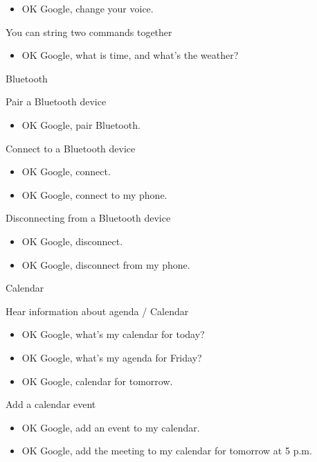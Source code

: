 \documentclass[
  a4paper,
]{article}
\providecommand{\tightlist}{%
  \setlength{\itemsep}{0pt}\setlength{\parskip}{0pt}}\usepackage{longtable,booktabs,array}
\begin{document}
\begin{itemize}
\tightlist
\item
  OK Google, change your voice.
\end{itemize}

You can string two commands together

\begin{itemize}
\tightlist
\item
  OK Google, what is time, and what's the weather?
\end{itemize}

Bluetooth

Pair a Bluetooth device

\begin{itemize}
\tightlist
\item
  OK Google, pair Bluetooth.
\end{itemize}

Connect to a Bluetooth device

\begin{itemize}
\tightlist
\item
  OK Google, connect.
\item
  OK Google, connect to my phone.
\end{itemize}

Disconnecting from a Bluetooth device

\begin{itemize}
\tightlist
\item
  OK Google, disconnect.
\item
  OK Google, disconnect from my phone.
\end{itemize}

Calendar

Hear information about agenda / Calendar

\begin{itemize}
\tightlist
\item
  OK Google, what's my calendar for today?
\item
  OK Google, what's my agenda for Friday?
\item
  OK Google, calendar for tomorrow.
\end{itemize}

Add a calendar event

\begin{itemize}
\tightlist
\item
  OK Google, add an event to my calendar.
\item
  OK Google, add the meeting to my calendar for tomorrow at 5 p.m.
\end{itemize}
\end{document}
